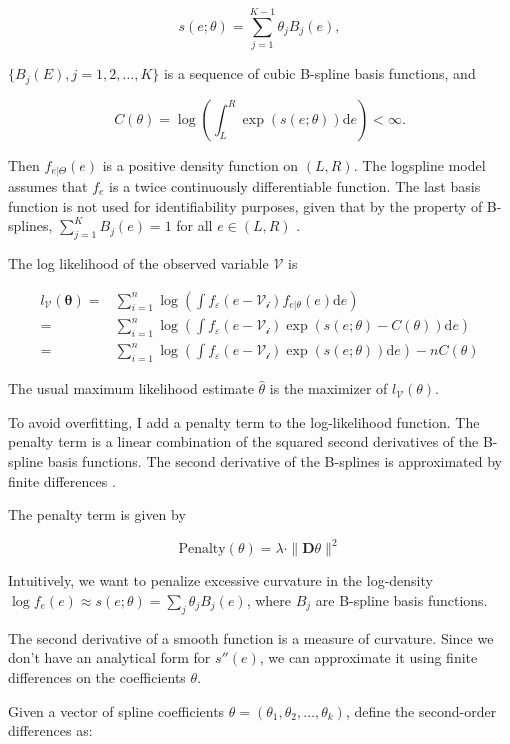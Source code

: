 \documentclass[
  12pt]{article}
\theoremstyle{definition}
\theoremstyle{remark}
\begin{document}
\[
s(e;\theta)=\sum_{j=1}^{K-1}\theta_j B_j(e),
\]

\(\{B_j(E), j=1,2,\dots, K\}\) is a sequence of cubic B-spline basis
functions, and

\[
C(\theta) = \log\left(\int^R_L \exp(s(e;\theta)) \text{d}e \right) < \infty .
\]

Then \(f_{e|\Theta}(e)\) is a positive density function on \((L,R)\).
The logspline model assumes that \(f_e\) is a twice continuously
differentiable function. The last basis function is not used for
identifiability purposes, given that by the property of B-splines,
\(\sum_{j=1}^{K}B_j(e)=1\) for all \(e \in (L,R)\) .

The log likelihood of the observed variable \(\mathcal{V}\) is

\[
\begin{aligned}
    l_{\mathcal{V}}(\mathbf{\theta})=&\sum_{i=1}^{n}\log \left(\int f_{\varepsilon}(e-\mathcal{V_i})f_{e|\theta}(e)\text{d}e\right)\\
    =&\sum_{i=1}^{n}\log \left(\int f_{\varepsilon}(e-\mathcal{V_i})\exp(s(e;\theta)-C(\theta))\text{d}e\right)\\
    =&\sum_{i=1}^{n}\log \left(\int f_{\varepsilon}(e-\mathcal{V_i})\exp(s(e;\theta))\text{d}e\right)-nC(\theta)
\end{aligned}
\]

The usual maximum likelihood estimate \(\hat{\theta}\) is the maximizer
of \(l_{\mathcal{V}}(\theta)\).

To avoid overfitting, I add a penalty term to the log-likelihood
function. The penalty term is a linear combination of the squared second
derivatives of the B-spline basis functions. The second derivative of
the B-splines is approximated by finite differences \citep{Eilers1996}.

The penalty term is given by

\[
\text{Penalty}(\theta) = \lambda \cdot \|\mathbf{D}\theta \|^2
\]

Intuitively, we want to penalize excessive curvature in the log-density
\(\log f_e(e) \approx s(e; \theta) = \sum_j \theta_j B_j(e)\), where
\(B_j\) are B-spline basis functions.

The second derivative of a smooth function is a measure of curvature.
Since we don't have an analytical form for \(s''(e)\), we can
approximate it using finite differences on the coefficients \(\theta\).

Given a vector of spline coefficients
\(\theta = (\theta_1, \theta_2, \ldots, \theta_k)\), define the
second-order differences as:
\end{document}

